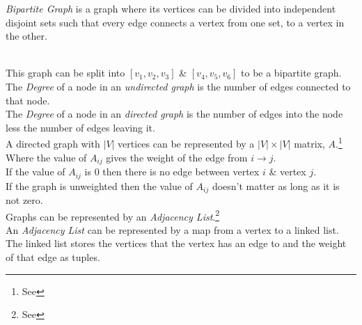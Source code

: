 \documentclass[11pt,a4paper]{article}
\begin{document}
\textit{Bipartite Graph} is a graph where its vertices can be divided into independent disjoint sets such that every edge connects a vertex from one set, to a vertex in the other.\\

\\
This graph can be split into $[v_1, v_2, v_3]$ \& $[v_4, v_5, v_6]$ to be a bipartite graph.\\

The \textit{Degree} of a node in an \textit{undirected graph} is the number of edges connected to that node.\\
The \textit{Degree} of a node in an \textit{directed graph} is the number of edges into the node less the number of edges leaving it.\\

A directed graph with $|V|$ vertices can be represented by a $|V|\times|V|$ matrix, $A$.\footnote{See }\\
Where the value of $A_{ij}$ gives the weight of the edge from $i\to j$.\\
If the value of $A_{ij}$ is $0$ then there is no edge between vertex $i$ \& vertex $j$.\\
If the graph is unweighted then the value of $A_{ij}$ doesn't matter as long as it is not zero.\\

Graphs can be represented by an \textit{Adjacency List}.\footnote{See }\\
An \textit{Adjacency List} can be represented by a map from a vertex to a linked list.\\
The linked list stores the vertices that the vertex has an edge to and the weight of that edge as tuples.\\
\end{document}
